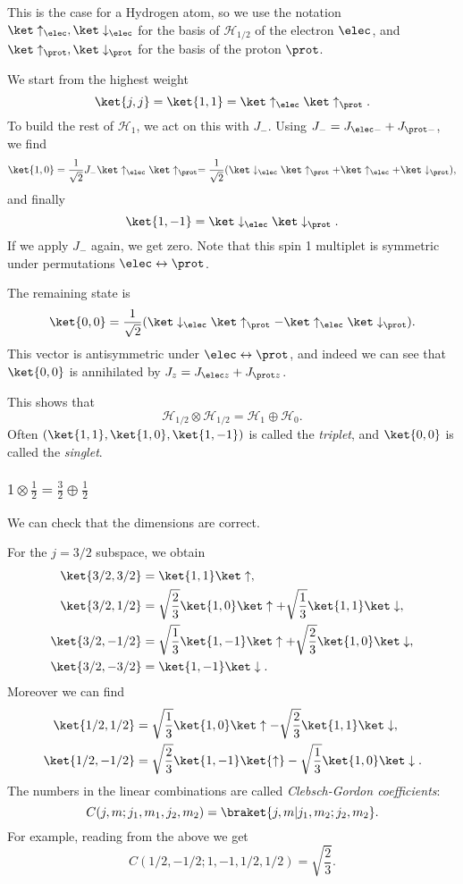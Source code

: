 \documentclass[12pt]{article}
\begin{document}
This is the case for a Hydrogen atom, so we use the notation $\ket \uparrow_\elec, \ket \downarrow_\elec$ for the basis of $\mathcal{H}_{1/2}$ of the electron $\elec$, and $\ket \uparrow_\prot, \ket \downarrow_\prot$ for the basis of the proton $\prot$.

We start from the highest weight
\[
	\ket{j, j} = \ket{1, 1} = \ket \uparrow_{\elec} \ket \uparrow_{\prot}.
\]
To build the rest of $\mathcal{H}_1$, we act on this with $J_-$. Using $J_- = J_{\elec -} + J_{\prot -}$, we find
\[
	\ket{1, 0} = \frac{1}{\sqrt 2} J_- \ket \uparrow_\elec \ket \uparrow_\prot = \frac{1}{\sqrt 2} (\ket \downarrow_\elec \ket \uparrow_\prot + \ket \uparrow_\elec + \ket\downarrow_\prot),
\]
and finally
\[
	\ket{1,-1} = \ket\downarrow_\elec\ket\downarrow_\prot.
\]
If we apply $J_-$ again, we get zero. Note that this spin 1 multiplet is symmetric under permutations $\elec \leftrightarrow \prot$.

The remaining state is
\[
	\ket{0,0} = \frac{1}{\sqrt 2} (\ket\downarrow_\elec\ket\uparrow_\prot - \ket\uparrow_\elec\ket\downarrow_\prot).
\]
This vector is antisymmetric under $\elec \leftrightarrow \prot$, and indeed we can see that $\ket{0,0}$ is annihilated by $J_z = J_{\elec z} + J_{\prot z}$.

This shows that
\[
\mathcal{H}_{1/2} \otimes \mathcal{H}_{1/2} = \mathcal{H}_1 \oplus \mathcal{H}_0.
\]
Often $(\ket{1, 1}, \ket{1, 0}, \ket{1, -1})$ is called the \emph{triplet}, and $\ket{0,0}$ is called the \emph{singlet}.

\subsubsection{$1 \otimes \frac{1}{2} = \frac{3}{2} \oplus \frac{1}{2}$}
\label{subsub:add_ex_2}

We can check that the dimensions are correct.

For the $j = 3/2$ subspace, we obtain
\begin{align*}
	\ket{3/2, 3/2} &= \ket{1, 1} \ket\uparrow, \\
	\ket{3/2, 1/2} &= \sqrt{\frac{2}{3}} \ket{1,0} \ket\uparrow + \sqrt{\frac{1}{3}} \ket{1,1} \ket\downarrow,\\
	\ket{3/2, -1/2} &= \sqrt{\frac{1}{3}}\ket{1,-1}\ket\uparrow + \sqrt{\frac{2}{3}}\ket{1,0}\ket\downarrow,\\
	\ket{3/2,-3/2} &= \ket{1,-1}\ket\downarrow.
\end{align*}
Moreover we can find
\begin{align*}
	\ket{1/2,1/2} &= \sqrt{\frac{1}{3}} \ket{1,0}\ket\uparrow - \sqrt{\frac{2}{3}}\ket{1,1}\ket\downarrow,\\
	\ket{1/2,-1/2}&= \sqrt{\frac{2}{3}} \ket{1,-1}\ket{\uparrow} - \sqrt{\frac{1}{3}} \ket{1,0}\ket\downarrow.
\end{align*}
The numbers in the linear combinations are called \emph{Clebsch-Gordon coefficients}:
\[
	C(j,m;j_1,m_1,j_2,m_2) = \braket{j,m|j_1,m_2; j_2,m_2}.
\]
For example, reading from the above we get
\[
	C(1/2, -1/2; 1, -1, 1/2, 1/2) = \sqrt{\frac{2}{3}}.
\]
\end{document}
